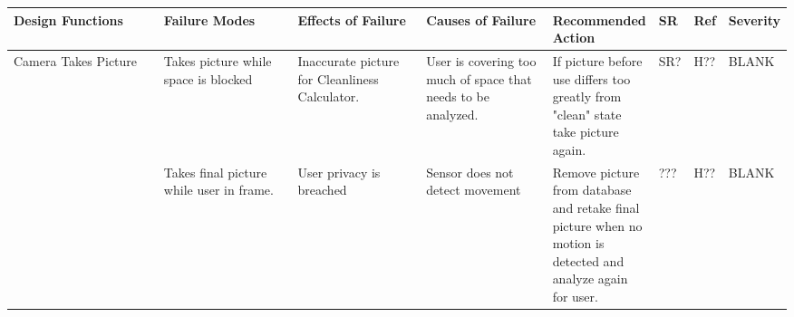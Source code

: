 \documentclass{article}
\begin{document}
\begin{table}[H]
\begin{adjustbox}{width=\textwidth}
\begin{tabular}{|p{0.27\linewidth} | p{0.25\linewidth} | p{0.22\linewidth}|  p{0.22\linewidth}|  p{0.30\linewidth}|  p{0.07\linewidth}|  p{0.07\linewidth}|p{0.12\linewidth}| }
    \hline
         \textbf{Design Functions} & \textbf{Failure Modes} & \textbf{Effects of Failure} & \textbf{Causes of Failure} & \textbf{Recommended Action} & \textbf{SR} & \textbf{Ref} & \textbf{Severity}\\
         \hline
         Camera Takes Picture & Takes picture while space is blocked\newline & Inaccurate picture for Cleanliness Calculator.\newline & User is covering too much of space that needs to be analyzed.\newline & If picture before use differs too greatly from "clean" state take picture again. & SR? & H?? & BLANK\\
          & Takes final picture while user in frame. & User privacy is breached & Sensor does not detect movement& Remove picture from database and retake final picture when no motion is detected and analyze again for user.  & ??? & H?? & BLANK\\
         \hline

\end{tabular}
\end{adjustbox}
\end{table}
\end{document}
